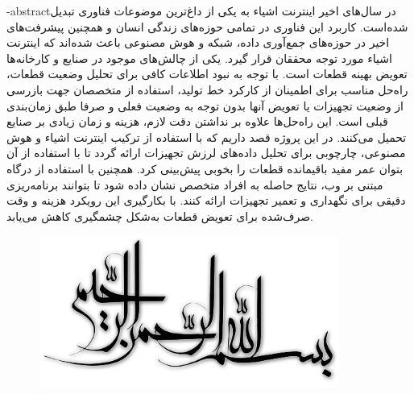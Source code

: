 \name{}
\surname{}

\fa-abstract{در سال‌های اخیر اینترنت اشیاء به یکی از داغ‌ترین موضوعات فناوری تبدیل شده‌است. کاربرد این فناوری در تمامی حوزه‌های زندگی انسان و همچنین پیشرفت‌های اخیر در حوزه‌های جمع‌آوری داده، شبکه و هوش مصنوعی باعث شده‌اند که اینترنت اشیاء مورد توجه محققان قرار گیرد. یکی از چالش‌های موجود در صنایع و کارخانه‌ها تعویض بهینه قطعات است. با توجه به نبود اطلاعات کافی برای تحلیل وضعیت قطعات، راه‌حل مناسب برای اطمینان از کارکرد خط تولید، استفاده از متخصصان جهت بازرسی از وضعیت تجهیزات یا تعویض آنها بدون توجه به وضعیت فعلی و صرفا طبق زمان‌بندی قبلی است. این راه‌حل‌ها علاوه بر نداشتن دقت لازم، هزینه و زمان زیادی بر صنایع تحمیل می‌کنند. در این پروژه قصد داریم که با استفاده از ترکیب اینترنت اشیاء و هوش مصنوعی، چارچوبی برای تحلیل داده‌های لرزش تجهیزات ارائه گردد تا با استفاده از آن بتوان عمر مفید باقیمانده قطعات را بخوبی پیش‌بینی کرد. همچنین با استفاده از درگاه مبتنی بر وب، نتایج حاصله به افراد متخصص نشان داده شود تا بتوانند برنامه‌ریزی دقیقی برای نگهداری و تعمیر تجهیزات ارائه کنند. با بکارگیری این رویکرد هزینه و وقت صرف‌شده برای تعویض قطعات به‌شکل چشمگیری کاهش می‌یابد.}





\AUTtitle
\vspace*{7cm}
\thispagestyle{empty}
\begin{center}
\includegraphics[height=5cm,width=12cm]{besm}
\end{center}
